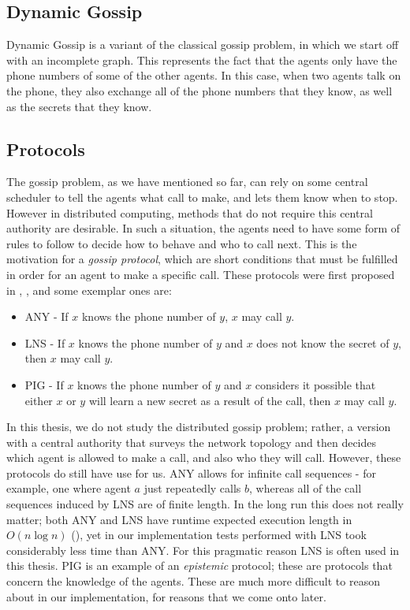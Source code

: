 \documentclass[10pt, a4paper]{report}
\begin{document}
\subsection{Dynamic Gossip}

Dynamic Gossip is a variant of the classical gossip problem, in which we start
off with an incomplete graph. This represents the fact that the agents only have
the phone numbers of some of the other agents. In this case, when two agents
talk on the phone, they also exchange all of the phone numbers that they know,
as well as the secrets that they know. 

\subsection{Protocols}
\label{sec:Protocols}

The gossip problem, as we have mentioned so far, can rely on some central
scheduler to tell the agents what call to make, and lets them know when to stop.
However in distributed computing, methods that do not require this central
authority are desirable. In such a situation, the agents need to have some form
of rules to follow to decide how to behave and who to call next. This is the
motivation for a \emph{gossip protocol}, which are short conditions that must
be fulfilled in order for an agent to make a specific call. These protocols were
first proposed in \cite{EPfDG}, \cite{KnowledgeandGossip}, and some exemplar
ones are:

\begin{itemize}
\item \textsf{ANY} - If $x$ knows the phone number of $y$, $x$ may call $y$.
\item \textsf{LNS} - If $x$ knows the phone number of $y$ and $x$ does not
    know the secret of $y$, then $x$ may call $y$.
  \item \textsf{PIG} - If $x$ knows the phone number of $y$ and $x$ considers it
    possible that either $x$ or $y$ will learn a new secret as a result of the
    call, then $x$ may call $y$.
\end{itemize}

In this thesis, we do not study the distributed gossip problem; rather, a
version with a central authority that surveys the network topology and then
decides which agent is allowed to make a call, and also who they will call.
However, these protocols do still have use for us. \textsf{ANY} allows for
infinite call sequences - for example, one where agent $a$ just repeatedly calls
$b$, whereas all of the call sequences induced by \textsf{LNS} are of finite
length. In the long run this does not really matter; both \textsf{ANY} and
\textsf{LNS} have runtime expected execution length in $O(n \log n)$
(\cite{DynamicGossip}), yet in our implementation tests performed with
\textsf{LNS} took considerably less time than \textsf{ANY}. For this pragmatic
reason \textsf{LNS} is often used in this thesis. \textsf{PIG} is an example of
an \emph{epistemic} protocol; these are protocols that concern the knowledge of
the agents. These are much more difficult to reason about in our implementation,
for reasons that we come onto later.
\end{document}
